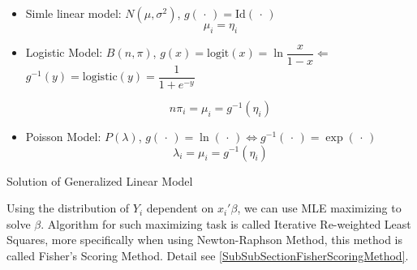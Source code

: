 \begin{itemize}[topsep=2pt,itemsep=0pt]
    \item Simle linear model: $ N(\mu ,\sigma ^2) $, $ g(\,\cdot\,)=\mathrm{Id}(\,\cdot\,) $
    \begin{equation}
        \mu _i=\eta_i
    \end{equation}
    \item Logistic Model: $ B(n,\pi) $, $ g(x)=\mathrm{logit}(x)=\ln\dfrac{x}{1-x}\Leftarrow   $$ g^{-1}(y)=\mathrm{logistic}(y)=\dfrac{1}{1+e^{-y}}  $
    
    \begin{equation}
        n\pi_i=\mu _i=g^{-1}(\eta_i) 
    \end{equation}
    
    \item Poisson Model: $ P(\lambda ) $, $ g(\,\cdot\,)=\ln(\,\cdot\,)\Leftrightarrow g^{-1}(\,\cdot\,)=\exp(\,\cdot\,)  $
    \begin{equation}
        \lambda _i=\mu_i=g^{-1}(\eta_i) 
    \end{equation}
    
    
\end{itemize}

    
\begin{point}
    Solution of Generalized Linear Model
\end{point}

    Using the distribution of $ Y_i $ dependent on $ x_i'\beta  $, we can use MLE maximizing to solve $ \beta  $. Algorithm for such maximizing task is called Iterative Re-weighted Least Squares, more specifically when using Newton-Raphson Method, this method is called Fisher's Scoring Method. Detail see \autoref{SubSubSectionFisherScoringMethod}.



    



















    
